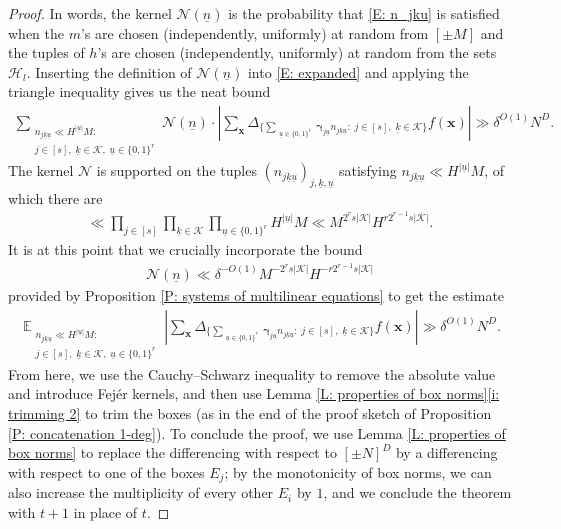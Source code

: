 \documentclass[11pt]{amsart}
\theoremstyle{definition}
\DeclareMathOperator*{\E}{\mathbb{E}}
\newcommand{\CH}{{\mathcal H}}
\newcommand{\CK}{{\mathcal K}}
\newcommand{\CN}{{\mathcal N}}
\newcommand{\bx}{{\textbf{x}}}
\newcommand{\bgamma}{{\boldsymbol{\gamma}}}
\newcommand{\uk}{{\underline{k}}}
\newcommand{\un}{{\underline{n}}}
\newcommand{\uu}{{\underline{u}}}
\newcommand{\abs}[1]{\mathopen{}\left| #1\mathclose{}\right|}
\begin{document}
\begin{proof}
    In words, the kernel $\CN(\un)$ is the probability that \eqref{E: n_jku} is satisfied when the $m$'s are chosen (independently, uniformly) at random from $[\pm M]$ and the tuples of $h$'s are chosen (independently, uniformly) at random from the sets $\CH_l$.
    Inserting the definition of $\CN(\un)$ into \eqref{E: expanded} and applying the triangle inequality gives us the neat bound
    \begin{align*}
        \sum_{\substack{n_{j\uk\uu}\ll H^{|\uu|}M:\\ j\in[s],\; \uk\in\CK,\; \uu\in\{0,1\}^r 
        }}\CN(\un)\cdot\abs{\sum_\bx \Delta_{\{\sum_{\substack{\uu\in\{0,1\}^r
        }}\bgamma_{j\uu} n_{j\uk\uu}:\; j\in[s],\; \uk\in\CK\}}f(\bx)}\gg \delta^{O(1)} N^D.
    \end{align*}
    The kernel $\CN$ is supported on the tuples 
    $(n_{j\uk\uu})_{j,\uk,\uu}$ satisfying $n_{j\uk\uu}\ll H^{|\uu|} M$, of which there are
    \begin{align*}
        \ll \prod_{j\in[s]}\prod_{\uk\in\CK} \prod_{\uu\in\{0,1\}^r} H^{|\uu|} M \ll  M^{2^r s |\CK|} H^{r 2^{r-1} s |\CK|}. 
    \end{align*}
    It is at this point that we crucially incorporate the bound
    \begin{align}\label{E: naive estimate}
        \CN(\un)\ll \delta^{-O(1)}  M^{- 2^r s |\CK|} H^{-r 2^{r-1} s |\CK|}
    \end{align}
    provided by  Proposition \ref{P: systems of multilinear equations} to get the estimate
    \begin{align*}
        \E_{\substack{n_{j\uk\uu}\ll H^{|\uu|}M:\\ j\in[s],\; \uk\in\CK,\; \uu\in\{0,1\}^r
        }}\abs{\sum_\bx \Delta_{\{\sum_{\substack{\uu\in\{0,1\}^r
        }}\bgamma_{j\uu} n_{j\uk\uu}:\; j\in[s],\; \uk\in\CK\}}f(\bx)}\gg \delta^{O(1)} N^D.
    \end{align*}
From here, we use the Cauchy--Schwarz inequality to remove the absolute value and introduce Fej\'er kernels, and then use Lemma \ref{L: properties of box norms}\eqref{i: trimming 2} to trim the boxes (as in the end of the proof sketch of Proposition \ref{P: concatenation 1-deg}).  To conclude the proof, we use Lemma \ref{L: properties of box norms} to replace the differencing with respect to $[\pm N]^D$ by a differencing with respect to one of the boxes $E_j$; by the monotonicity of box norms, we can also increase the multiplicity of every other $E_i$ by $1$, and we conclude the theorem with $t+1$ in place of $t$.
\end{proof}
\end{document}
